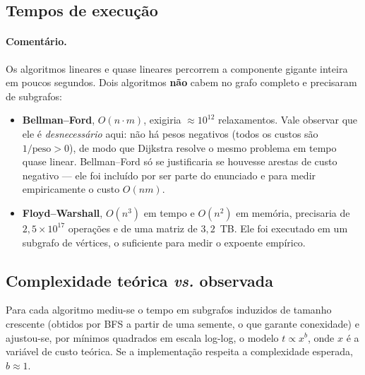 \documentclass[sigconf]{webmedia}
\begin{document}
\subsection{Tempos de execução}

\begin{table}[t]
\centering
\caption{Tempo real de execução das implementações próprias.
$^{\dagger}$ Bellman--Ford foi executado sobre um subgrafo induzido com
$n=\subBF{}$ e $m=\subBFm{}$.
$^{\ddagger}$ Floyd--Warshall sobre um subgrafo com $n=\subFW{}$.}
\label{tab:tempos}
\scriptsize

\end{table}

\paragraph{Comentário.} Os algoritmos lineares e quase lineares percorrem
a componente gigante inteira em poucos segundos. Dois algoritmos
\textbf{não} cabem no grafo completo e precisaram de subgrafos:

\begin{itemize}[nosep]
  \item \textbf{Bellman--Ford}, $O(n\cdot m)$, exigiria
        $\approx 10^{12}$ relaxamentos. Vale observar que ele é
        \emph{desnecessário} aqui: não há pesos negativos (todos os custos
        são $1/\text{peso} > 0$), de modo que Dijkstra resolve o mesmo
        problema em tempo quase linear. Bellman--Ford só se justificaria se
        houvesse arestas de custo negativo --- ele foi incluído por ser
        parte do enunciado e para medir empiricamente o custo $O(nm)$.
  \item \textbf{Floyd--Warshall}, $O(n^3)$ em tempo e $O(n^2)$ em memória,
        precisaria de $2{,}5\times10^{17}$ operações e de uma matriz de
        $3{,}2$~TB. Ele foi executado em um subgrafo de \subFW{} vértices,
        o suficiente para medir o expoente empírico.
\end{itemize}

\subsection{Complexidade teórica \textit{vs.} observada}

Para cada algoritmo mediu-se o tempo em subgrafos induzidos de tamanho
crescente (obtidos por BFS a partir de uma semente, o que garante
conexidade) e ajustou-se, por mínimos quadrados em escala log-log, o modelo
$t \propto x^{b}$, onde $x$ é a variável de custo teórica. Se a
implementação respeita a complexidade esperada, $b \approx 1$.
\end{document}
